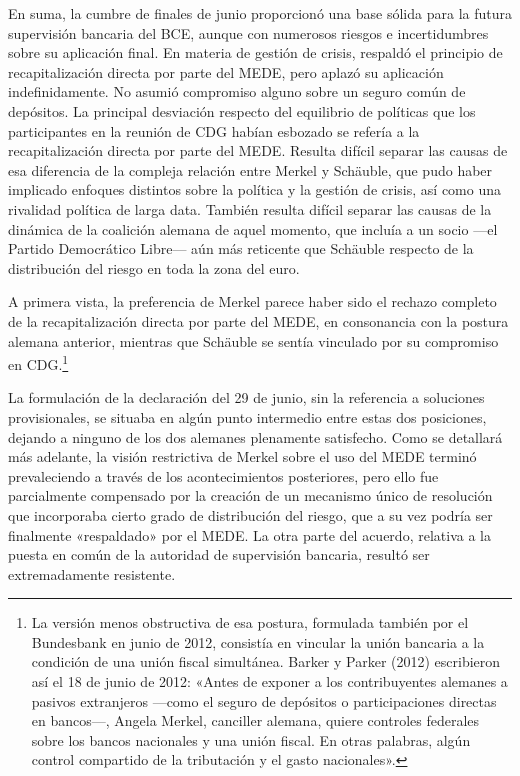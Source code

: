 \documentclass[10pt,a4paper]{article}
\begin{document}
{En suma, la cumbre de finales de junio proporcionó una base sólida para la futura supervisión bancaria del BCE, aunque con numerosos riesgos e incertidumbres sobre su aplicación final. En materia de gestión de crisis, respaldó el principio de recapitalización directa por parte del MEDE, pero aplazó su aplicación indefinidamente. No asumió compromiso alguno sobre un seguro común de depósitos. La principal desviación respecto del equilibrio de políticas que los participantes en la reunión de CDG habían esbozado se refería a la recapitalización directa por parte del MEDE. Resulta difícil separar las causas de esa diferencia de la compleja relación entre Merkel y Schäuble, que pudo haber implicado enfoques distintos sobre la política y la gestión de crisis, así como una rivalidad política de larga data. También resulta difícil separar las causas de la dinámica de la coalición alemana de aquel momento, que incluía a un socio —el Partido Democrático Libre— aún más reticente que Schäuble respecto de la distribución del riesgo en toda la zona del euro.

A primera vista, la preferencia de Merkel parece haber sido el rechazo completo de la recapitalización directa por parte del MEDE, en consonancia con la postura alemana anterior, mientras que Schäuble se sentía vinculado por su compromiso en CDG.\footnote{%
    La versión menos obstructiva de esa postura, formulada también por el Bundesbank en junio de 2012, consistía en vincular la unión bancaria a la condición de una unión fiscal simultánea. Barker y Parker (2012) escribieron así el 18 de junio de 2012: «Antes de exponer a los contribuyentes alemanes a pasivos extranjeros —como el seguro de depósitos o participaciones directas en bancos—, Angela Merkel, canciller alemana, quiere controles federales sobre los bancos nacionales y una unión fiscal. En otras palabras, algún control compartido de la tributación y el gasto nacionales».
}

La formulación de la declaración del 29 de junio, sin la referencia a soluciones provisionales, se situaba en algún punto intermedio entre estas dos posiciones, dejando a ninguno de los dos alemanes plenamente satisfecho. Como se detallará más adelante, la visión restrictiva de Merkel sobre el uso del MEDE terminó prevaleciendo a través de los acontecimientos posteriores, pero ello fue parcialmente compensado por la creación de un mecanismo único de resolución que incorporaba cierto grado de distribución del riesgo, que a su vez podría ser finalmente «respaldado» por el MEDE. La otra parte del acuerdo, relativa a la puesta en común de la autoridad de supervisión bancaria, resultó ser extremadamente resistente.

}
\end{document}
